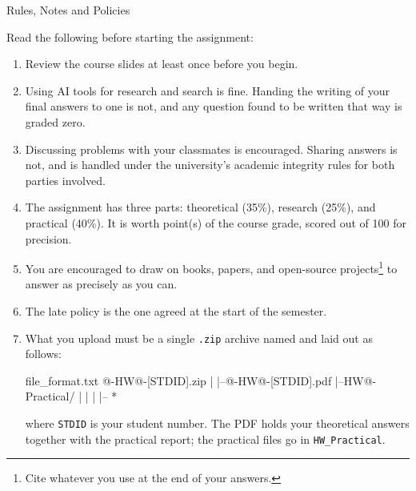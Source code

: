 \begin{neobox}[neotitlefont=\pixelfont]{Rules, Notes and Policies}

    \vspace{5mm}

    \begin{center}
        \Large{Read the following before starting the assignment:}
    \end{center}

    \begin{enumerate}
        \item Review the course slides at least once before you begin.

        \item Using AI tools for research and search is fine. Handing the
              writing of your final answers to one is not, and any question
              found to be written that way is graded zero.

        \item Discussing problems with your classmates is encouraged. Sharing
              answers is not, and is handled under the university's academic
              integrity rules for both parties involved.

        \item The assignment has three parts: theoretical (35\%), research
              (25\%), and practical (40\%). It is worth \hwgrade{} point(s)
              of the course grade, scored out of 100 for precision.

        \item You are encouraged to draw on books, papers, and open-source
              projects\footnote{Cite whatever you use at the end of your
              answers.} to answer as precisely as you can.

        \item The late policy is the one agreed at the start of the semester.

        \item What you upload must be a single \texttt{.zip} archive named and
              laid out as follows:

              \begin{neocode}[neocodetitlefont=\pixelfont]{file\_format.txt}
\coursecode @-HW@\hwnumber@-[STDID].zip
|
|--\coursecode @-HW@\hwnumber@-[STDID].pdf
|--HW@\hwnumber@-Practical/
|       |
|       |-- *
              \end{neocode}

              where \texttt{STDID} is your student number. The PDF holds your
              theoretical answers together with the practical report; the
              practical files go in \texttt{HW\hwnumber\_Practical}.


\end{enumerate}
\end{neobox}

